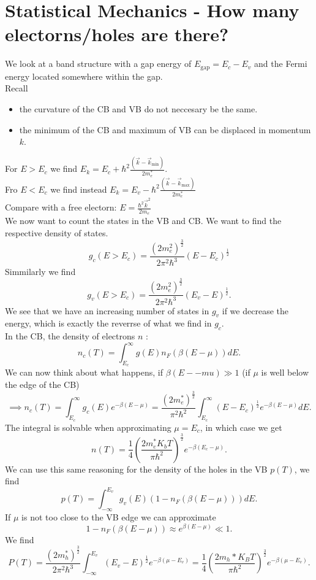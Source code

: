 \documentclass{report}
\begin{document}
\section{Statistical Mechanics - How many electorns/holes are there?}
We look at a band structure with a gap energy of $E_\text{gap} = E_c - E_v$ and the Fermi energy located somewhere within the gap.\\
Recall
\begin{itemize}
	\item the curvature of the CB and VB do not neccesary be the same.
	\item the minimum of the CB and maximum of VB can be displaced in momentum $k$.
\end{itemize}
For $E>E_c$ we find $E_k = E_c + \hbar^2 \frac{\left( \vec{k} - \vec{k}_\text{min} \right) }{2 m_e^*}$. \\
Fro $E < E_c$ we find instead $E_k = E_v - \hbar^2 \frac{\left( \vec{k} - \vec{k}_\text{max} \right) }{2 m_e^*}$\\
Compare with a free electorn: $E = \frac{\hbar^2 \vec{k}^2}{2m_e}$ \\
We now want to count the states in the VB and CB. We want to find the respective density of states. \[
	g_c\left( E > E_c \right) = \frac{\left( 2m_e^2 \right) ^{\frac{3}{2}} }{2 \pi^2 \hbar^3} \left( E - E_c \right) ^{\frac{1}{2}} 
\] Simmilarly we find \[
	g_v\left( E > E_c \right) = \frac{\left( 2m_e^2 \right) ^{\frac{3}{2}} }{2 \pi^2 \hbar^3} \left( E_v - E \right) ^{\frac{1}{2}} 
.\]  
We see that we have an increasing number of states in $g_v$ if we decrease the energy, which is exactly the reverrse of what we find in $g_c$.\\
In the CB, the density of electrons $n$ : \[
	n_c(T) = \int_{E_c}^\infty g(E) n_F\left( \beta\left( E - \mu \right)  \right) dE
.\] 
We can now think about what happens, if $\beta \left( E - -mu \right) \gg 1$ (if $\mu$ is well below the edge of the CB) \[
	\implies n_c(T) = \int_{E_c}^\infty g_c(E) e^{-\beta \left( E - \mu \right) } = \frac{\left( 2 m_e^* \right) ^{\frac{3}{2}}}{\pi^2 \hbar^2} \int_{E_c}^\infty \left( E - E_c \right) ^\frac{1}{2} e^{-\beta \left( E - \mu \right) } dE
.\] The integral is solvable when approximating $\mu = E_c$, in which case we get \[
n(T) = \frac{1}{4} \left( \frac{2 m_e^* K_b T}{\pi \hbar^2} \right) ^{\frac{3}{2}} e^{-\beta \left( E_c - \mu \right) }
.\] We can use this same reasoning for the density of the holes in the VB $p(T)$, we find \[
p(T) = \int_{-\infty}^{E_v} g_v(E) \left( 1 - n_F\left( \beta\left( E- \mu \right)  \right)  \right) dE
.\] If $\mu$ is not too close to the VB edge we can approximate \[
1- n_F\left( \beta \left( E - \mu \right)  \right) \approx e^{\beta \left( E - \mu \right) } \ll 1
.\] We find \[
P(T) = \frac{\left( 2 m_h^* \right)^{\frac{3}{2}}}{2 \pi^2 \hbar^3} \int_{-\infty}^{E_v} \left( E_v - E \right) ^{\frac{1}{2}} e^{-\beta \left( \mu - E_v \right) } = \frac{1}{4} \left( \frac{2m_h* K_B T}{\pi \hbar^2} \right) ^{\frac{3}{2}}  e^{-\beta\left( \mu - E_v \right) }
.\] 
\end{document}
